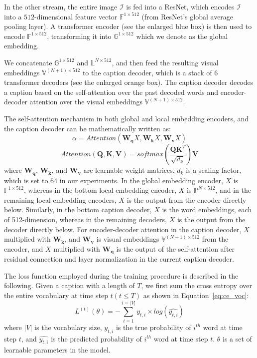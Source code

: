 \documentclass[journal]{IEEEtran}
\begin{document}
In the other stream, the entire image $\mathcal{I}$ is fed into a ResNet, which encodes $\mathcal{I}$ into a $512$-dimensional feature vector $\mathbb{F}^{1 \times 512}$ (from ResNet's global average pooling layer). A transformer encoder (see the enlarged blue box) is then used to encode $\mathbb{F}^{1 \times 512}$, transforming it into $\mathbb{G}^{1 \times 512}$ which we denote as the global embedding.




We concatenate $\mathbb{G}^{1 \times 512}$ and $\mathbb{L}^{N \times 512}$, and then feed the resulting visual embeddings $\mathbb{V}^{(N+1) \times 512}$ to the caption decoder, which is a stack of 6 transformer decoders (see the enlarged orange box). The caption decoder decodes a caption based on the self-attention over the past decoded words and encoder-decoder attention over the visual embeddings $\mathbb{V}^{(N+1) \times 512}$. 

The self-attention mechanism in both global and local embedding encoders, and the caption decoder can be mathematically written as:
\begin{equation}\label{eq:alpha}
    \alpha = Attention(\bm{W_q}X, \bm{W_k}X, \bm{W_v}X)
\end{equation}
\begin{equation}\label{eq:attention}
    Attention(\bm{Q}, \bm{K}, \bm{V}) = softmax(\frac{\bm{QK}^T}{\sqrt{d_k}})\bm{V}
\end{equation}
where $\bm{W_q}$, $\bm{W_k}$, and $\bm{W_v}$ are learnable weight matrices. $d_k$ is a scaling factor, which is set to 64 in our experiments. In the global embedding encoder, $X$ is $\mathbb{F}^{1 \times 512}$, whereas in the bottom local embedding encoder, $X$ is $\mathbb{P}^{N \times 512}$, and in the remaining local embedding encoders, $X$ is the output from the encoder directly below. Similarly, in the bottom caption decoder, $X$ is the word embeddings, each of 512-dimension, whereas in the remaining decoders, $X$ is the output from the decoder directly below. For encoder-decoder attention in the caption decoder, $X$ multiplied with $\bm{W_k}$, and $\bm{W_v}$ is visual embeddings $\mathbb{V}^{(N+1) \times 512}$ from the encoder, and $X$ multiplied with $\bm{W_q}$ is the output of the self-attention after residual connection and layer normalization in the current caption decoder.


The loss function employed during the training procedure is described in the following. Given a caption with a length of $T$, we first sum the cross entropy over the entire vocabulary at time step $t (t\leq T)$ as shown in Equation~\ref{eq:ce_voc}:
\begin{equation}\label{eq:ce_voc}
    L^{(t)}(\theta) = - \sum_{i=1}^{i=|V|} y_{t,i} \times log(\hat{y_{t,i}})
\end{equation}
where $|V|$ is the vocabulary size, $y_{t,i}$ is the true probability of $i^{th}$ word at time step $t$, and $\hat{y_{t,i}}$ is the predicted probability of $i^{th}$ word at time step $t$. $\theta$ is a set of learnable parameters in the model.
\end{document}

